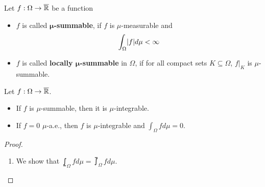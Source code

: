 \begin{dfn}[]
  Let $f: \Omega \to \overline{\mathbb{R}}$ be a function
  \begin{itemize}
    \item $f$ is called \textbf{$\bm{\mu}$-summable}, if $f$ is $\mu$-measurable and
      \begin{align*}
        \int_{\Omega} \abs{f} d \mu < \infty
      \end{align*}
    \item $f$ is called \textbf{locally $\bm{\mu}$-summable} in $\Omega$, if for all compact sets $K \subseteq \Omega$, $f|_K$ is $\mu$-summable.
  \end{itemize}
\end{dfn}


\begin{prop}
Let $f: \Omega \to \overline{\mathbb{R}}$.
\begin{itemize}
  \item If $f$ is $\mu$-summable, then it is $\mu$-integrable.
  \item If $f = 0$ $\mu$-a.e., then $f$ is $\mu$-integrable and $\int_{\Omega} f d \mu = 0$.
\end{itemize}
\end{prop}
\begin{proof}
  \phantom{a}
  \begin{enumerate}
    \item We show that $\lowint_{\Omega}f d \mu = \upint_{\Omega} f d \mu$.
  \end{enumerate}

\end{proof}
